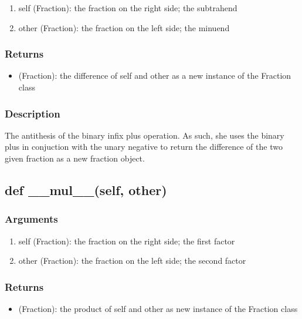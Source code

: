 \documentclass[refman]{scrartcl}
\begin{document}
\begin{enumerate}
	\item self (Fraction): the fraction on the right side; the subtrahend
	\item other (Fraction): the fraction on the left side; the minuend
\end{enumerate}

\subsubsection*{Returns}

\begin{itemize}
	\item (Fraction): the difference of self and other as a new instance of the Fraction class
\end{itemize}

\subsubsection*{Description}

The antithesis of the binary infix plus operation. As such, she uses the binary plus in conjuction with the unary negative to return the difference of the two given fraction as a new fraction object.

\subsection{def \_\_mul\_\_(self, other)}

\subsubsection*{Arguments}

\begin{enumerate}
	\item self (Fraction): the fraction on the right side; the first factor
	\item other (Fraction): the fraction on the left side; the second factor
\end{enumerate}

\subsubsection*{Returns}

\begin{itemize}
	\item (Fraction): the product of self and other as new instance of the Fraction class
\end{itemize}
\end{document}
